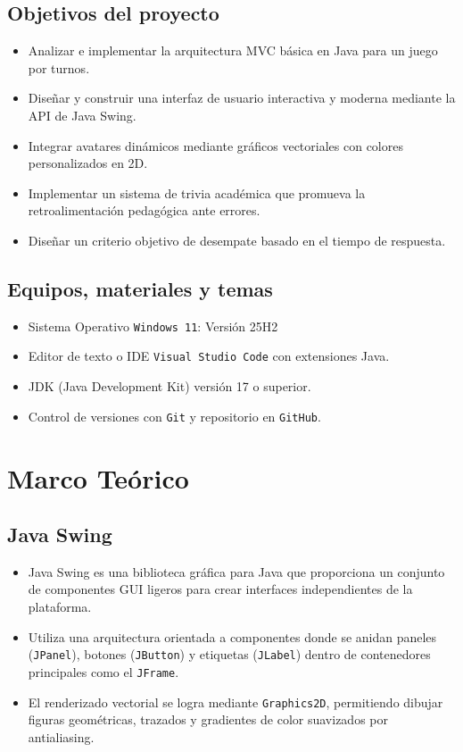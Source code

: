 \documentclass{article}
\begin{document}
\subsection{Objetivos del proyecto}
\begin{itemize}
	\item Analizar e implementar la arquitectura MVC básica en Java para un juego por turnos.
	\item Diseñar y construir una interfaz de usuario interactiva y moderna mediante la API de Java Swing.
	\item Integrar avatares dinámicos mediante gráficos vectoriales con colores personalizados en 2D.
	\item Implementar un sistema de trivia académica que promueva la retroalimentación pedagógica ante errores.
	\item Diseñar un criterio objetivo de desempate basado en el tiempo de respuesta.
\end{itemize}
 
\subsection{Equipos, materiales y temas}
\begin{itemize}
	\item Sistema Operativo {\tt Windows 11}: Versión 25H2
	\item Editor de texto o IDE {\tt Visual Studio Code} con extensiones Java.
	\item JDK (Java Development Kit) versión 17 o superior.
	\item Control de versiones con {\tt Git} y repositorio en {\tt GitHub}.
\end{itemize}
 
\section{Marco Teórico}
 
\subsection{Java Swing}
\begin{itemize}
	\item Java Swing es una biblioteca gráfica para Java que proporciona un conjunto de componentes GUI ligeros para crear interfaces independientes de la plataforma.
	\item Utiliza una arquitectura orientada a componentes donde se anidan paneles (\texttt{JPanel}), botones (\texttt{JButton}) y etiquetas (\texttt{JLabel}) dentro de contenedores principales como el \texttt{JFrame}.
	\item El renderizado vectorial se logra mediante \texttt{Graphics2D}, permitiendo dibujar figuras geométricas, trazados y gradientes de color suavizados por antialiasing.
\end{itemize}
 
\end{document}
